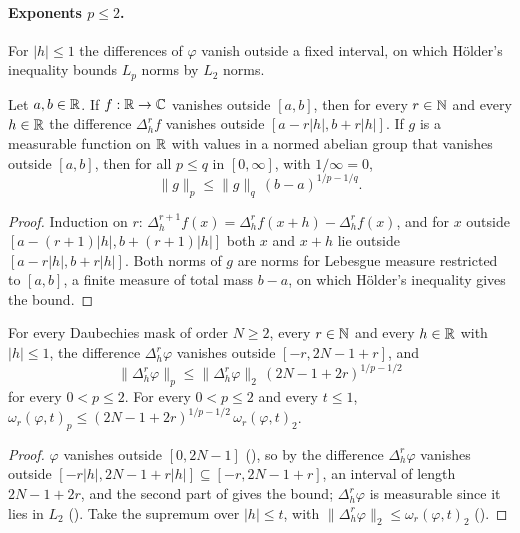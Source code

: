 \paragraph{Exponents $p \leq 2$.}
For $|h| \leq 1$ the differences of $\varphi$ vanish outside a fixed interval, on which
H\"older's inequality bounds $L_p$ norms by $L_2$ norms.

\begin{lemma}
\label{lem:daub-difference-support}
\leanok
{}
Let $a, b \in \mathbb{R}$. If $f : \mathbb{R} \to \mathbb{C}$ vanishes outside $[a, b]$, then for every $r \in \mathbb{N}$ and
every $h \in \mathbb{R}$ the difference $\Delta_h^r f$ vanishes outside $[a - r|h|, b + r|h|]$. If $g$
is a measurable function on $\mathbb{R}$ with values in a normed abelian group that vanishes outside
$[a, b]$, then for all $p \leq q$ in $[0, \infty]$, with $1/\infty = 0$,
\[
  \|g\|_p \leq \|g\|_q \, (b - a)^{1/p - 1/q} .
\]
\end{lemma}

\begin{proof}
\leanok
Induction on $r$: $\Delta_h^{r+1} f(x) = \Delta_h^r f(x + h) - \Delta_h^r f(x)$, and for $x$
outside $[a - (r+1)|h|, b + (r+1)|h|]$ both $x$ and $x + h$ lie outside
$[a - r|h|, b + r|h|]$. Both norms of $g$ are norms for Lebesgue measure restricted to
$[a, b]$, a finite measure of total mass $b - a$, on which H\"older's inequality gives the
bound.
\end{proof}

\begin{lemma}
\label{lem:daub-modulus-lp-l2}
\leanok
{}
For every Daubechies mask of order $N \geq 2$, every $r \in \mathbb{N}$ and every $h \in \mathbb{R}$ with
$|h| \leq 1$, the difference $\Delta_h^r \varphi$ vanishes outside $[-r, 2N - 1 + r]$, and
\[
  \|\Delta_h^r \varphi\|_p \leq \|\Delta_h^r \varphi\|_2 \, (2N - 1 + 2r)^{1/p - 1/2}
\]
for every $0 < p \leq 2$. For every $0 < p \leq 2$ and every $t \leq 1$,
$\omega_r(\varphi, t)_p \leq (2N - 1 + 2r)^{1/p - 1/2} \, \omega_r(\varphi, t)_2$.
\end{lemma}

\begin{proof}
\leanok
{}
$\varphi$ vanishes outside $[0, 2N - 1]$ (), so by
 the difference $\Delta_h^r \varphi$ vanishes outside
$[-r|h|, 2N - 1 + r|h|] \subseteq [-r, 2N - 1 + r]$, an interval of length $2N - 1 + 2r$, and the
second part of  gives the bound; $\Delta_h^r \varphi$ is
measurable since it lies in $L_2$ (). Take the
supremum over $|h| \leq t$, with $\|\Delta_h^r \varphi\|_2 \leq \omega_r(\varphi, t)_2$
().
\end{proof}

